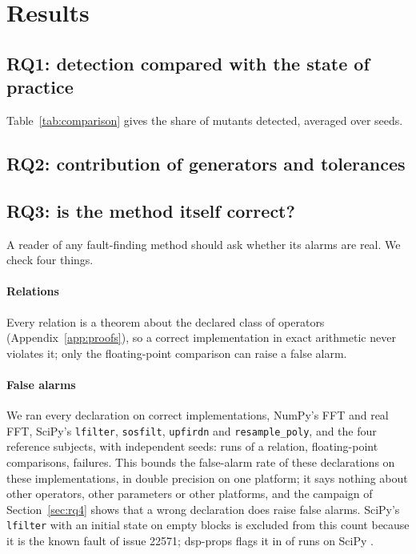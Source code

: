 \documentclass[10pt,conference]{IEEEtran}
\newcommand{\code}[1]{\texttt{#1}}
\begin{document}
\section{Results}
\label{sec:results}

\subsection{RQ1: detection compared with the state of practice}
\label{sec:rq1}



Table~\ref{tab:comparison} gives the share of mutants detected, averaged over
seeds. \rqOneText

\subsection{RQ2: contribution of generators and tolerances}
\label{sec:rq2}



\rqTwoText

\subsection{RQ3: is the method itself correct?}
\label{sec:rq3}

A reader of any fault-finding method should ask whether its alarms are real.
We check four things.

\paragraph*{Relations} Every relation is a theorem about the declared class of
operators (Appendix~\ref{app:proofs}), so a correct implementation in exact
arithmetic never violates it; only the floating-point comparison can raise a
false alarm.

\paragraph*{False alarms} We ran every declaration on correct implementations,
NumPy's FFT and real FFT, SciPy's \code{lfilter}, \code{sosfilt},
\code{upfirdn} and \code{resample\_poly}, and the four reference subjects, with
\fpSeeds{} independent seeds: \fpRuns{} runs of a relation, \fpComparisons{}
floating-point comparisons, \fpFailed{} failures. This bounds the false-alarm
rate of these declarations on these implementations, in double precision on
one platform; it says nothing about other operators, other parameters or other
platforms, and the campaign of Section~\ref{sec:rq4} shows that a wrong
declaration does raise false alarms. SciPy's \code{lfilter} with
an initial state on empty blocks is excluded from this count because it is the
known fault of issue 22571; dsp-props flags it in \knownBugFlagged{} of
\knownBugRuns{} runs on SciPy \scipyVersion.
\end{document}

